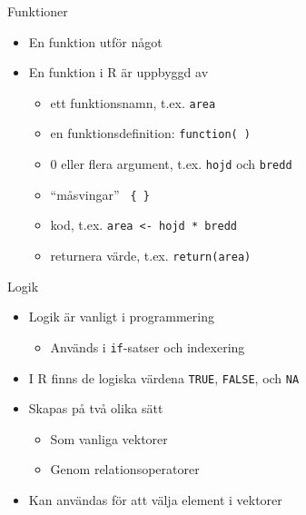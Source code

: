 \documentclass[
  11pt,
  ignorenonframetext,
]{beamer}
\providecommand{\tightlist}{%
  \setlength{\itemsep}{0pt}\setlength{\parskip}{0pt}}
\begin{document}

\begin{frame}{Funktioner}
\protect\hypertarget{funktioner}{}
\begin{itemize}
\tightlist
\item
  En funktion utför något
\item
  En funktion i R är uppbyggd av

  \begin{itemize}
  \tightlist
  \item
    ett funktionsnamn, t.ex. \texttt{area}
  \item
    en funktionsdefinition: \texttt{function( )}
  \item
    0 eller flera argument, t.ex. \texttt{hojd} och \texttt{bredd}
  \item
    ``måsvingar'' \texttt{ \{ \} }
  \item
    kod, t.ex. \texttt{area <- hojd * bredd}
  \item
    returnera värde, t.ex. \texttt{return(area)}
  \end{itemize}
\end{itemize}
\end{frame}


\begin{frame}{Logik}
\protect\hypertarget{logik}{}
\begin{itemize}
\tightlist
\item
  Logik är vanligt i programmering

  \begin{itemize}
  \tightlist
  \item
    Används i \texttt{if}-satser och indexering
  \end{itemize}
\item
  I R finns de logiska värdena \texttt{TRUE}, \texttt{FALSE}, och
  \texttt{NA}
\item
  Skapas på två olika sätt

  \begin{itemize}
  \tightlist
  \item
    Som vanliga vektorer
  \item
    Genom relationsoperatorer
  \end{itemize}
\item
  Kan användas för att välja element i vektorer
\end{itemize}
\end{frame}
\end{document}
